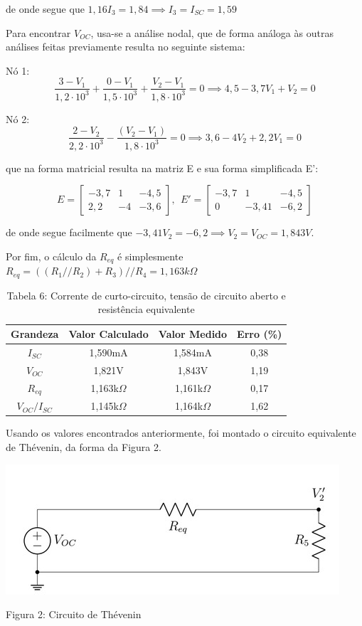 \documentclass[a4 paper]{article}
\begin{document}
\noindent de onde segue que $1,16I_3 = 1,84 \implies I_3 = I_{SC} = 1,59$

Para encontrar $V_{OC}$, usa-se a análise nodal, que de forma análoga às outras análises feitas previamente resulta no seguinte sistema:


Nó 1:
\[
\frac{3-V_1}{1,2\cdot10^3}+\frac{0-V_1}{1,5\cdot10^3}+\frac{V_2-V_1}{1,8\cdot10^3}=0 \implies 4,5-3,7V_1+V_2=0
\]

Nó 2:
\[
\frac{2-V_2}{2,2\cdot10^3}-\frac{(V_2-V_1)}{1,8\cdot10^3}=0 \implies 3,6-4V_2+2,2V_1=0
\]

\noindent que na forma matricial resulta na matriz E e sua forma simplificada E':

\[
E=
\begin{bmatrix}
-3,7 & 1 & -4,5\\
2,2 & -4 & -3,6
\end{bmatrix},\ \ 
E' =
\begin{bmatrix}
-3,7 & 1 & -4,5\\
0 & -3,41 & -6,2
\end{bmatrix}
\]

\noindent de onde segue facilmente que $-3,41V_2=-6,2 \implies V_2 = V_{OC}= 1,843V$.

Por fim, o cálculo da $R_{eq}$ é simplesmente $R_{eq}=((R_1//R_2)+R_3)//R_4=1,163k\Omega$

\vspace{5pt}
\begin{table}[h]
\centering
\begin{tabular}{|c|c|c|c|}
\hline
 Grandeza & Valor Calculado & Valor Medido & Erro (\%) \\\hline
 $I_{SC}$ &1,590mA &1,584mA & 0,38\\\hline
 $V_{OC}$& 1,821V & 1,843V & 1,19 \\\hline
 $R_{eq}$&1,163k$\Omega$ &1,161k$\Omega$ & 0,17 \\\hline
 ${V_{OC}}/{I_{SC}}$&1,145k$\Omega$ &1,164k$\Omega$ &1,62 \\\hline
\end{tabular}
\caption*{Tabela 6: Corrente de curto-circuito, tensão de circuito aberto e resistência equivalente}
\end{table}


Usando os valores encontrados anteriormente, foi montado o circuito equivalente de Thévenin, da forma da Figura 2.

\begin{table}[h]
\centering
\includegraphics[scale=0.6]{figuras/figura2}
\end{table}
\begin{center}
Figura 2: Circuito de Thévenin
\end{center}
\end{document}

